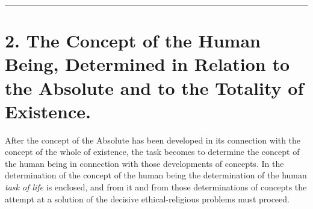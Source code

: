 \documentclass[12pt,a4paper]{book}
\begin{document}
\begin{center}\rule{2cm}{0.4pt}\end{center}

\section*{2. The Concept of the Human Being, Determined in Relation to the Absolute and to the Totality of Existence.}

After the concept of the Absolute has been developed in its connection with
the concept of the whole of existence, the task becomes to determine the
concept of the human being in connection with those developments of concepts.
In the determination of the concept of the human being the determination of
the human \emph{task of life} is enclosed, and from it and from those
determinations of concepts the attempt at a solution of the decisive
ethical-religious problems must proceed.
\end{document}
